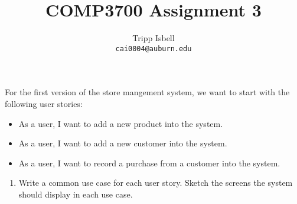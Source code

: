 \documentclass[notitlepage, 11pt]{report}
\title{COMP3700 Assignment 3}
\author{Tripp Isbell\\
	\texttt{cai0004@auburn.edu}}
\date{}
\begin{document}
\maketitle
For the first version of the store mangement system, we want to start with the following user stories:
\begin{itemize}
	\item As a user, I want to add a new product into the system.
	\item As a user, I want to add a new customer into the system.
	\item As a user, I want to record a purchase from a customer into the system.
\end{itemize}
\begin{enumerate}[itemindent=-1.5em]
	\item Write a common use case for each user story. Sketch the screens the system should display in each use case.
	

\end{enumerate}
\end{document}
